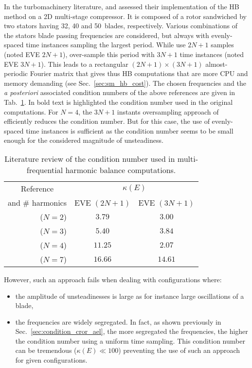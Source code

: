 In the turbomachinery literature, \citet{Gopinath2007} and
\citet{Ekici2007} assessed their implementation of the
HB method on a 2D multi-stage compressor. 
It is composed of a rotor sandwiched by two stators having
32, 40 and 50~blades, respectively. Various combinations of the stators
blade passing frequencies are considered, 
but always with evenly-spaced time instances sampling the
largest period.  While \citet{Gopinath2007} use $2N+1$ samples (noted EVE $2N+1$),
\citet{Ekici2007} over-sample this period with $3N+1$ time instances
(noted EVE $3N+1$). This
leads to a rectangular $(2N+1)\times(3N+1)$ almost-periodic Fourier
matrix that gives thus HB computations that are more CPU and memory demanding
(see Sec.~\ref{sec:sm_hb_cost}). 
The chosen frequencies and the \emph{a posteriori}
associated condition numbers of the above references are given in
Tab.~\ref{tab:literature_multistage}.  
In bold text is highlighted the condition number used in the
original computations.
For $N=4$, the $3N+1$ instants
oversampling approach of \citet{Ekici2007} efficiently reduces the
condition number. But for this case, the use of evenly-spaced time
instances is sufficient as the condition number seems to be small enough
for the considered magnitude of unsteadiness.
\begin{table}
  \centering
  \begin{tabular}{rcc}
    \toprule
    \multicolumn{1}{c}{Reference} & \multicolumn{2}{c}{$\kappa(E)$} \\
    \multicolumn{1}{c}{and \# harmonics} & EVE $(2N+1)$ & EVE $(3N+1)$ \\
    \midrule
    \citet{Gopinath2007} ($N=2$) & $\mathbf{3.79}$ & $3.00$ \\
    \citet{Ekici2007} ($N=3$) & $5.40$ & $\mathbf{3.84}$ \\
    \citet{Gopinath2007} ($N=4$) & $\mathbf{11.25}$ & $2.07$ \\
    \citet{Gopinath2007} ($N=7$) & $\mathbf{16.66}$ & $14.61$ \\
    \bottomrule
  \end{tabular}
  \caption{Literature review of the condition number used in multi-frequential
  harmonic balance computations.}
  \label{tab:literature_multistage}
\end{table}

However, such an approach fails when dealing with configurations where:
\begin{itemize} \itemsep0pt \parskip0pt
  \item the amplitude of unsteadinesses is large as for instance
  large oscillations of a blade,
  \item the frequencies are widely segregated. In fact, as shown previously
  in Sec.~\ref{sec:condition_cror_ael}, the more segregated the frequencies, the
  higher the condition number using a uniform time sampling. This condition number
  can be tremendous ($\kappa (E) \ll 100$) preventing the use of such
  an approach for given configurations.
\end{itemize}

